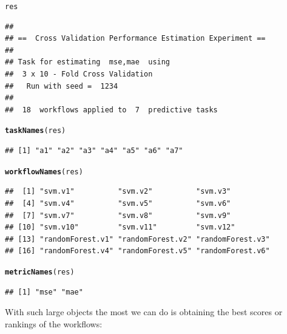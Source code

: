 \documentclass[10pt,a4paper]{article}\usepackage[]{graphicx}\usepackage[]{color}
\makeatletter
\newcommand{\hlstd}[1]{\textcolor[rgb]{0.345,0.345,0.345}{#1}}%
\newcommand{\hlkwd}[1]{\textcolor[rgb]{0.737,0.353,0.396}{\textbf{#1}}}%
\newenvironment{kframe}{%
 \def\at@end@of@kframe{}%
 \ifinner\ifhmode%
  \def\at@end@of@kframe{\end{minipage}}%
  \begin{minipage}{\columnwidth}%
 \fi\fi%
 \def\FrameCommand##1{\hskip\@totalleftmargin \hskip-\fboxsep
 \colorbox{shadecolor}{##1}\hskip-\fboxsep
     \hskip-\linewidth \hskip-\@totalleftmargin \hskip\columnwidth}%
 \MakeFramed {\advance\hsize-\width
   \@totalleftmargin\z@ \linewidth\hsize
   \@setminipage}}%
 {\par\unskip\endMakeFramed%
 \at@end@of@kframe}
\newenvironment{knitrout}{}{} %
\makeatother
\begin{document}
\begin{knitrout}\small
{}\color{fgcolor}\begin{kframe}
\begin{alltt}
\hlstd{res}
\end{alltt}
\begin{verbatim}
## 
## ==  Cross Validation Performance Estimation Experiment ==
## 
## Task for estimating  mse,mae  using
##  3 x 10 - Fold Cross Validation
## 	 Run with seed =  1234 
## 
##  18  workflows applied to  7  predictive tasks
\end{verbatim}
\begin{alltt}
\hlkwd{taskNames}\hlstd{(res)}
\end{alltt}
\begin{verbatim}
## [1] "a1" "a2" "a3" "a4" "a5" "a6" "a7"
\end{verbatim}
\begin{alltt}
\hlkwd{workflowNames}\hlstd{(res)}
\end{alltt}
\begin{verbatim}
##  [1] "svm.v1"          "svm.v2"          "svm.v3"         
##  [4] "svm.v4"          "svm.v5"          "svm.v6"         
##  [7] "svm.v7"          "svm.v8"          "svm.v9"         
## [10] "svm.v10"         "svm.v11"         "svm.v12"        
## [13] "randomForest.v1" "randomForest.v2" "randomForest.v3"
## [16] "randomForest.v4" "randomForest.v5" "randomForest.v6"
\end{verbatim}
\begin{alltt}
\hlkwd{metricNames}\hlstd{(res)}
\end{alltt}
\begin{verbatim}
## [1] "mse" "mae"
\end{verbatim}
\end{kframe}
\end{knitrout}

With such large objects the most we can do is obtaining the best
scores or rankings of the workflows:
\end{document}
